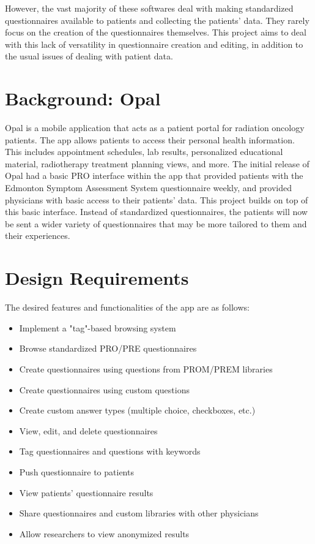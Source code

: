 \documentclass{higrep}
\begin{document}
However, the vast majority of these softwares deal with making standardized questionnaires available to patients and collecting the patients' data. They rarely focus on the creation of the questionnaires themselves. This project aims to deal with this lack of versatility in questionnaire creation and editing, in addition to the usual issues of dealing with patient data.
 
\chapter{Background: Opal}\label{Sec:Background}

Opal is a mobile application that acts as a patient portal for radiation oncology patients. The app allows patients to access their personal health information. This includes appointment schedules, lab results, personalized educational material, radiotherapy treatment planning views, and more. The initial release of Opal had a basic PRO interface within the app that provided patients with the Edmonton Symptom Assessment System questionnaire weekly, and provided physicians with basic access to their patients' data\cite{us}. This project builds on top of this basic interface. Instead of standardized questionnaires, the patients will now be sent a wider variety of questionnaires that may be more tailored to them and their experiences.

\chapter{Design Requirements}\label{Sec:DesignRequirements}

The desired features and functionalities of the app are as follows:
\begin{itemize}
\item Implement a "tag"-based browsing system
\item Browse standardized PRO/PRE questionnaires
\item Create questionnaires using questions from PROM/PREM libraries
\item Create questionnaires using custom questions
\item Create custom answer types (multiple choice, checkboxes, etc.)
\item View, edit, and delete questionnaires
\item Tag questionnaires and questions with keywords
\item Push questionnaire to patients
\item View patients' questionnaire results
\item Share questionnaires and custom libraries with other physicians
\item Allow researchers to view anonymized results
\end{itemize}
\end{document}
